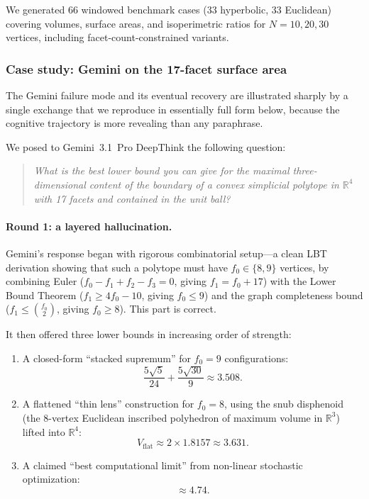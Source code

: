 \documentclass[11pt]{article}
\begin{document}
We generated 66 windowed benchmark cases (33 hyperbolic, 33 Euclidean)
covering volumes, surface areas, and isoperimetric ratios for
$N = 10, 20, 30$ vertices, including facet-count-constrained variants.

\subsubsection{Case study: Gemini on the 17-facet surface area}
\label{sec:gemini-17facet}

The Gemini failure mode and its eventual recovery are illustrated
sharply by a single exchange that we reproduce in essentially full
form below, because the cognitive trajectory is more revealing than
any paraphrase.

We posed to Gemini~3.1~Pro DeepThink the following question:

\begin{quote}
\emph{What is the best lower bound you can give for the maximal
three-dimensional content of the boundary of a convex simplicial
polytope in $\mathbb{R}^4$ with 17 facets and contained in the unit
ball?}
\end{quote}

\paragraph{Round 1: a layered hallucination.}
Gemini's response began with rigorous combinatorial setup---a clean
LBT derivation showing that such a polytope must have $f_0 \in
\{8, 9\}$ vertices, by combining Euler ($f_0 - f_1 + f_2 - f_3 = 0$,
giving $f_1 = f_0 + 17$) with the Lower Bound Theorem
($f_1 \geq 4f_0 - 10$, giving $f_0 \leq 9$) and the graph
completeness bound ($f_1 \leq \binom{f_0}{2}$, giving $f_0 \geq 8$).
This part is correct.

It then offered three lower bounds in increasing order of strength:
\begin{enumerate}
\item A closed-form ``stacked supremum'' for $f_0 = 9$
      configurations:
      \[ \frac{5\sqrt{5}}{24} + \frac{5\sqrt{30}}{9} \approx 3.508. \]
\item A flattened ``thin lens'' construction for $f_0 = 8$, using
      the snub disphenoid (the 8-vertex Euclidean inscribed
      polyhedron of maximum volume in $\mathbb{R}^3$) lifted into
      $\mathbb{R}^4$:
      \[ V_{\text{flat}} \approx 2 \times 1.8157 \approx 3.631. \]
\item A claimed ``best computational limit'' from non-linear
      stochastic optimization:
      \[ \approx \mathbf{4.74}. \]
\end{enumerate}
\end{document}
